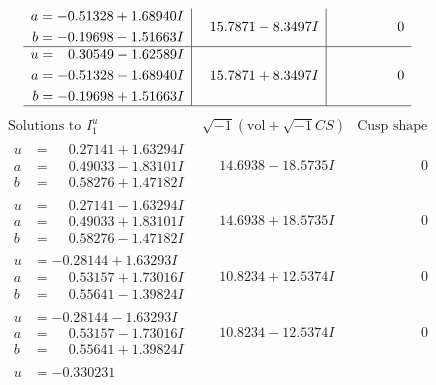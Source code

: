 \documentclass[1p]{elsarticle_modified}
\theoremstyle{definition}
\newcommand{\I}{\sqrt{-1}}
\begin{document}
$$\begin{array}{c|c|c}
\begin{aligned}
a &= -0.51328 + 1.68940 I \\
b &= -0.19698 - 1.51663 I\end{aligned}
 & \phantom{-}15.7871 - 8.3497 I & \phantom{-0.000000 } 0 \\ \hline\begin{aligned}
u &= \phantom{-}0.30549 - 1.62589 I \\
a &= -0.51328 - 1.68940 I \\
b &= -0.19698 + 1.51663 I\end{aligned}
 & \phantom{-}15.7871 + 8.3497 I & \phantom{-0.000000 } 0\\
 \hline 
 \end{array}$$\newpage$$\begin{array}{c|c|c}  
\text{Solutions to }I^u_{1}& \I (\text{vol} + \sqrt{-1}CS) & \text{Cusp shape}\\
 \hline 
\begin{aligned}
u &= \phantom{-}0.27141 + 1.63294 I \\
a &= \phantom{-}0.49033 - 1.83101 I \\
b &= \phantom{-}0.58276 + 1.47182 I\end{aligned}
 & \phantom{-}14.6938 - 18.5735 I & \phantom{-0.000000 } 0 \\ \hline\begin{aligned}
u &= \phantom{-}0.27141 - 1.63294 I \\
a &= \phantom{-}0.49033 + 1.83101 I \\
b &= \phantom{-}0.58276 - 1.47182 I\end{aligned}
 & \phantom{-}14.6938 + 18.5735 I & \phantom{-0.000000 } 0 \\ \hline\begin{aligned}
u &= -0.28144 + 1.63293 I \\
a &= \phantom{-}0.53157 + 1.73016 I \\
b &= \phantom{-}0.55641 - 1.39824 I\end{aligned}
 & \phantom{-}10.8234 + 12.5374 I & \phantom{-0.000000 } 0 \\ \hline\begin{aligned}
u &= -0.28144 - 1.63293 I \\
a &= \phantom{-}0.53157 - 1.73016 I \\
b &= \phantom{-}0.55641 + 1.39824 I\end{aligned}
 & \phantom{-}10.8234 - 12.5374 I & \phantom{-0.000000 } 0 \\ \hline\begin{aligned}
u &= -0.330231\phantom{ +0.000000I} \\

\end{aligned}
\end{array}$$
\end{document}
